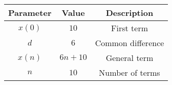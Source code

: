 \begin{tabular}{|c|c|c|}
    \hline
    \textbf{Parameter} & \textbf{Value} & \textbf{Description} \\
    \hline
    $x(0)$ & $10$ & First term \\
    \hline
    $d$ & $6$ & Common difference \\
    \hline 
    $x(n)$ & $6n+10$ & General term \\
    \hline 
    $n$ & $10$ & Number of terms \\
    \hline
\end{tabular}

